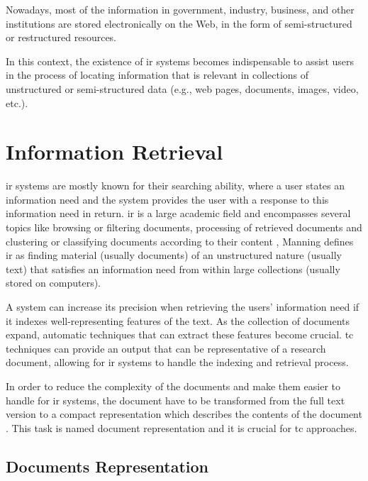 Nowadays, most of the information in government, industry, business, and other institutions are stored electronically on the Web, in the form of semi-structured or restructured resources.

In this context, the existence of \gls{ir} systems becomes indispensable to assist users in the process of locating information that is relevant in collections of unstructured or semi-structured data (e.g., web pages, documents, images, video, etc.).  


\section{\hspace{3pt}Information Retrieval}

\gls{ir} systems are mostly known for their searching ability, where a user states an information need and the system provides the user with a response to this information need in return. \gls{ir} is a large academic field and encompasses several topics like browsing or filtering documents, processing of retrieved documents and clustering or classifying documents according to their content \cite{Manning:2008}, Manning defines \gls{ir} as finding material (usually documents) of an unstructured nature (usually text) that satisfies an information need from within large collections (usually stored on computers).

A system can increase its precision when retrieving the users' information need if it indexes well-representing features of the text. As the collection of documents expand, automatic techniques that can extract these features become crucial.  \gls{tc} techniques can provide an output that can be representative of a research document, allowing for \gls{ir} systems to handle the indexing and retrieval process.

In order to reduce the complexity of the documents and make them easier to handle for \gls{ir} systems, the document have to be transformed from the full text version to a compact representation which describes the contents of the document \cite{meadow1992text}. This task is named document representation and it is crucial for \gls{tc} approaches. 

\subsection{\hspace*{3pt}Documents Representation}

